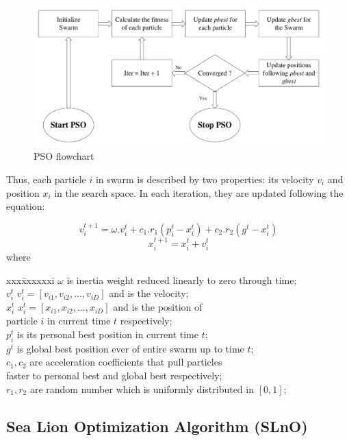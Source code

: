 \documentclass[a4paper,13pt,2p]{report}
\begin{document}
\begin{figure}[!ht] 
   \centering
   \includegraphics[width=0.75\linewidth]{pdf/model/pso}
  \caption{PSO flowchart} 
  \label{fig_pso_algo} 
\end{figure}
	 
Thus, each particle $i$ in swarm is described by two properties: its velocity $v_i$ and position $x_i$ in the search space. In each iteration, they are updated following the equation: 

\begin{equation} \label{eq_pso_1}
v_i^{t+1} = \omega.v_i^t + c_1.r_1(p_i^t - x_i^t) + c_2.r_2(g^t - x_i^t)
\end{equation}
\begin{equation} \label{eq_pso_2}
x_i^{t+1} = x_i^t + v_i^t
\end{equation}
where 
\begin{tabbing}
	xxx\=xxxxxxi\=\kill
	\>	$\omega$			\>	is inertia weight reduced linearly to zero through time; \\
	\>	$v_i^t$			\>	$v_i^t = [v_{i1}, v_{i2}, ..., v_{iD}]$ and is the velocity;	\\
	\>	$x_i^t$			\>	$x_i^t = [x_{i1}, x_{i2}, ..., x_{iD}]$ and is the position of 	\\
	\> 	\phantom{inv}	\> 	particle $i$ in current time $t$ respectively;\\
	\>	$p_i^t$			\>	is its personal best position in current time $t$; \\
	\>	$g^t$			\>	is global best position ever of entire swarm up to time $t$; \\
	\>	$c_1, c_2$ 		\>	are acceleration coefficients that pull particles \\
	\>	\phantom{inv} 	\>	faster to personal best and global best respectively;\\
	\>	$r_1, r_2$ 		\>	are random number which is uniformly distributed in $[0,1]$; \\
\end{tabbing}
\subsection{Sea Lion Optimization Algorithm (SLnO)}
\label{slno_standard} 
\end{document}
